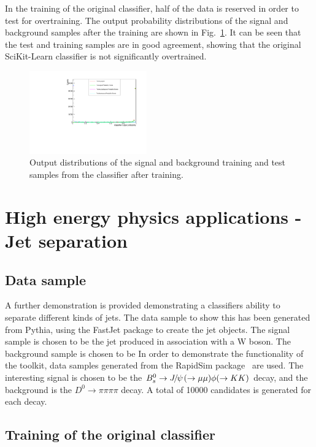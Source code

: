 \documentclass[final,5p,times,twocolumn]{elsarticle}
\def\Ppsi        {\ensuremath{\uppsi}\xspace}
\def\PB      {\ensuremath{\mathrm{B}}\xspace}
\def\PD      {\ensuremath{\mathrm{D}}\xspace}
\def\PJ      {\ensuremath{\mathrm{J}}\xspace}
\def\PK      {\ensuremath{\mathrm{K}}\xspace}
\def\Ps      {\ensuremath{\mathrm{s}}\xspace}
\def\Ppsi        {\ensuremath{\psi}\xspace}
\def\PB      {\ensuremath{B}\xspace}
\def\PD      {\ensuremath{D}\xspace}
\def\PJ      {\ensuremath{J}\xspace}
\def\PK      {\ensuremath{K}\xspace}
\def\Ps      {\ensuremath{s}\xspace}
\def\squark    {{\ensuremath{\Ps}}\xspace}
\def\D       {{\ensuremath{\PD}}\xspace}
\def\Dz      {{\ensuremath{\D^0}}\xspace}
\def\B       {{\ensuremath{\PB}}\xspace}
\def\Bs      {{\ensuremath{\B^0_\squark}}\xspace}
\def\jpsi     {{\ensuremath{{\PJ\mskip -3mu/\mskip -2mu\Ppsi\mskip 2mu}}}\xspace}
\def\to                 {\ensuremath{\rightarrow}\xspace}
\begin{document}
In the training of the original classifier, half of the data is
reserved in order to test for overtraining.
The output probability distributions of the signal and background samples
after the training are shown in Fig.~\ref{fig:output}.
It can be seen that the test and training samples are in good agreement,
showing that the original SciKit-Learn classifier is not significantly overtrained.
\begin{figure}[t]
\centering
\includegraphics[width=0.45\textwidth]{event_probability.pdf}
\caption{\small 
Output distributions of the signal and background training and
test samples from the classifier after training.
}
\label{fig:output}
\end{figure}

\section{High energy physics applications - Jet separation}
\label{sec:hepGPD}

\subsection{Data sample}

A further demonstration is provided demonstrating a classifiers ability to separate different
kinds of jets. The data sample to show this has been generated from Pythia, using the FastJet package
to create the jet objects. The signal sample is chosen to be the jet produced in association with a W boson.
The background sample is chosen to be In order to demonstrate the functionality of the toolkit, data samples generated
from the RapidSim package~\cite{rapid} are used. The interesting signal is chosen
to be the $\Bs\to\jpsi(\to\mu\mu )\phi (\to\PK\PK )$ decay, and the background is
the $\Dz\to\pi\pi\pi\pi$ decay. A total of 10000 candidates is generated for each decay.

\subsection{Training of the original classifier}
\end{document}
